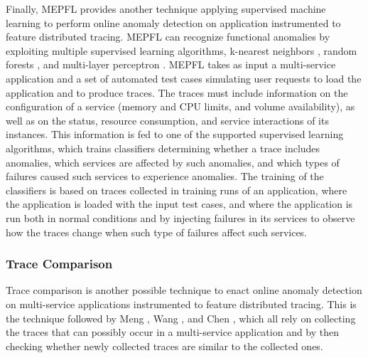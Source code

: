 Finally, MEPFL \cite{02_Zhou2019_LatentErrorPrediction} provides another technique applying supervised machine learning to perform online anomaly detection on application instrumented to feature distributed tracing.
MEPFL \cite{02_Zhou2019_LatentErrorPrediction} can recognize functional anomalies by exploiting multiple supervised learning algorithms, \viz k-nearest neighbors \cite{Altman1992_NearestNeighbor}, random forests \cite{Breiman2001_RandomForests}, and multi-layer perceptron \cite{Goodfellow2016_DeepLearningBook}.
MEPFL \cite{02_Zhou2019_LatentErrorPrediction} takes as input a multi-service application and a set of automated test cases simulating user requests to load the application and to produce traces.
The traces must include information on the configuration of a service (\viz memory and CPU limits, and volume availability), as well as on the status, resource consumption, and service interactions of its instances.
This information is fed to one of the supported supervised learning algorithms, which trains classifiers determining whether a trace includes anomalies, which services are affected by such anomalies, and which types of failures caused such services to experience anomalies. 
The training of the classifiers is based on traces collected in training runs of an application, where the application is loaded with the input test cases, and where the application is run both in normal conditions and by injecting failures in its services to observe how the traces change when such type of failures affect such services.

\subsubsection{Trace Comparison}
Trace comparison is another possible technique to enact online anomaly detection on multi-service applications instrumented to feature distributed tracing.
This is the technique followed by Meng \etal \cite{23_Meng2021_DetectingAnomaliesMicroservices}, Wang \etal \cite{26_Wang2020_WorkflowAwareFaultDiagnosis}, and Chen \etal \cite{39_Chen2020_MatrixSketchBasedAnomalyDetection}, which all rely on collecting the traces that can possibly occur in a multi-service application and by then checking whether newly collected traces are similar to the collected ones.

